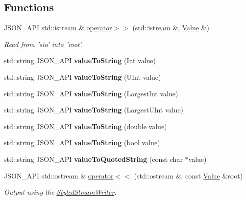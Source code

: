\subsection*{Functions}
\begin{DoxyCompactItemize}
\item 
J\+S\+O\+N\+\_\+\+A\+P\+I std\+::istream \& \hyperlink{namespace_json_a1b4aef303177bbd4d18acc87858e0ec2}{operator$>$$>$} (std\+::istream \&, \hyperlink{class_json_1_1_value}{Value} \&)
\begin{DoxyCompactList}\small\item\em Read from 'sin' into 'root'. \end{DoxyCompactList}\item 
\hypertarget{namespace_json_a05cd078d8e086a4bcc08d40948f711e7}{std\+::string J\+S\+O\+N\+\_\+\+A\+P\+I {\bfseries value\+To\+String} (Int value)}\label{namespace_json_a05cd078d8e086a4bcc08d40948f711e7}

\item 
\hypertarget{namespace_json_abcb58ea0f384c30608729a94d539e2ce}{std\+::string J\+S\+O\+N\+\_\+\+A\+P\+I {\bfseries value\+To\+String} (U\+Int value)}\label{namespace_json_abcb58ea0f384c30608729a94d539e2ce}

\item 
\hypertarget{namespace_json_aa1196d8fd3181d75e8e08dd298c9740f}{std\+::string J\+S\+O\+N\+\_\+\+A\+P\+I {\bfseries value\+To\+String} (Largest\+Int value)}\label{namespace_json_aa1196d8fd3181d75e8e08dd298c9740f}

\item 
\hypertarget{namespace_json_a0865b0680454002643dd9f3d22a2c80d}{std\+::string J\+S\+O\+N\+\_\+\+A\+P\+I {\bfseries value\+To\+String} (Largest\+U\+Int value)}\label{namespace_json_a0865b0680454002643dd9f3d22a2c80d}

\item 
\hypertarget{namespace_json_ac49317cb2f19e656c9cb548dd31e50d5}{std\+::string J\+S\+O\+N\+\_\+\+A\+P\+I {\bfseries value\+To\+String} (double value)}\label{namespace_json_ac49317cb2f19e656c9cb548dd31e50d5}

\item 
\hypertarget{namespace_json_a959f412bb2e8a5cf50f2cc36cd7b3376}{std\+::string J\+S\+O\+N\+\_\+\+A\+P\+I {\bfseries value\+To\+String} (bool value)}\label{namespace_json_a959f412bb2e8a5cf50f2cc36cd7b3376}

\item 
\hypertarget{namespace_json_aa89082c7ae7deaa6df955987015a0cbd}{std\+::string J\+S\+O\+N\+\_\+\+A\+P\+I {\bfseries value\+To\+Quoted\+String} (const char $\ast$value)}\label{namespace_json_aa89082c7ae7deaa6df955987015a0cbd}

\item 
J\+S\+O\+N\+\_\+\+A\+P\+I std\+::ostream \& \hyperlink{namespace_json_a0ef6e98bafd4dba52f6ef28ed33913f4}{operator$<$$<$} (std\+::ostream \&, const \hyperlink{class_json_1_1_value}{Value} \&root)
\begin{DoxyCompactList}\small\item\em Output using the \hyperlink{class_json_1_1_styled_stream_writer}{Styled\+Stream\+Writer}. \end{DoxyCompactList}\end{DoxyCompactItemize}


